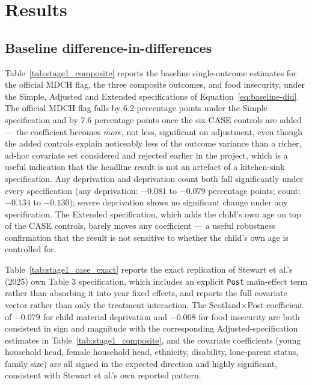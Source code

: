 \section{Results}
\label{sec:results}

\subsection{Baseline difference-in-differences}
\label{sec:res-baseline}

Table~\ref{tab:stage1_composite} reports the baseline single-outcome estimates for the official MDCH flag, the three composite outcomes, and food insecurity, under the Simple, Adjusted and Extended specifications of Equation~\ref{eq:baseline-did}. The official MDCH flag falls by 6.2 percentage points under the Simple specification and by 7.6 percentage points once the six CASE controls are added --- the coefficient becomes \emph{more}, not less, significant on adjustment, even though the added controls explain noticeably less of the outcome variance than a richer, ad-hoc covariate set considered and rejected earlier in the project, which is a useful indication that the headline result is not an artefact of a kitchen-sink specification. Any deprivation and deprivation count both fall significantly under every specification (any deprivation: $-0.081$ to $-0.079$ percentage points; count: $-0.134$ to $-0.130$); severe deprivation shows no significant change under any specification. The Extended specification, which adds the child's own age on top of the CASE controls, barely moves any coefficient --- a useful robustness confirmation that the result is not sensitive to whether the child's own age is controlled for.



Table~\ref{tab:stage1_case_exact} reports the exact replication of Stewart et al.'s (2025) own Table 3 specification, which includes an explicit \texttt{Post} main-effect term rather than absorbing it into year fixed effects, and reports the full covariate vector rather than only the treatment interaction. The Scotland$\times$Post coefficient of $-0.079$ for child material deprivation and $-0.068$ for food insecurity are both consistent in sign and magnitude with the corresponding Adjusted-specification estimates in Table~\ref{tab:stage1_composite}, and the covariate coefficients (young household head, female household head, ethnicity, disability, lone-parent status, family size) are all signed in the expected direction and highly significant, consistent with Stewart et al.'s own reported pattern.

